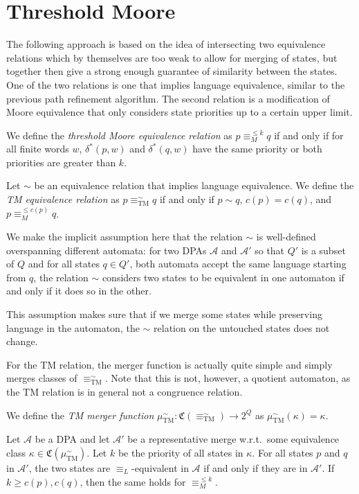 \section{Threshold Moore}
The following approach is based on the idea of intersecting two equivalence relations which by themselves are too weak to allow for merging of states, but together then give a strong enough guarantee of similarity between the states. One of the two relations is one that implies language equivalence, similar to the previous path refinement algorithm. The second relation is a modification of Moore equivalence that only considers state priorities up to a certain upper limit.

\begin{definition}
	We define the \emph{threshold Moore equivalence relation} as $p \equiv_M^{\leq k} q$ if and only if for all finite words $w$, $\delta^*(p, w)$ and $\delta^*(q, w)$ have the same priority or both priorities are greater than $k$.
	
	Let $\sim$ be an equivalence relation that implies language equivalence. We define the \emph{TM equivalence relation} as $p \equiv_\text{TM}^\sim q$ if and only if $p \sim q$, $c(p) = c(q)$, and $p \equiv_M^{\leq c(p)} q$.
\end{definition}

We make the implicit assumption here that the relation $\sim$ is well-defined overspanning different automata: for two DPAs $\mathcal{A}$ and $\mathcal{A}'$ so that $Q'$ is a subset of $Q$ and for all states $q \in Q'$, both automata accept the same language starting from $q$, the relation $\sim$ considers two states to be equivalent in one automaton if and only if it does so in the other.

This assumption makes sure that if we merge some states while preserving language in the automaton, the $\sim$ relation on the untouched states does not change.

For the TM relation, the merger function is actually quite simple and simply merges classes of $\equiv_\text{TM}^\sim$. Note that this is not, however, a quotient automaton, as the TM relation is in general not a congruence relation.

\begin{definition}
	We define the \emph{TM merger function} $\mu_\text{TM}^\sim : \mathfrak{C}(\equiv_\text{TM}^\sim) \rightarrow 2^Q$ as $\mu_\text{TM}^\sim(\kappa) = \kappa$.
\end{definition}

\begin{lemma}
	Let $\mathcal{A}$ be a DPA and let $\mathcal{A}'$ be a representative merge w.r.t.\ some equivalence class $\kappa \in \mathfrak{C}(\mu_\text{TM}^\sim)$. Let $k$ be the priority of all states in $\kappa$. For all states $p$ and $q$ in $\mathcal{A}'$, the two states are $\equiv_L$-equivalent in $\mathcal{A}$ if and only if they are in $\mathcal{A}'$. If $k \geq c(p), c(q)$, then the same holds for $\equiv_M^{\leq k}$.
	\label{lem:threshm_kappamerge}
\end{lemma}

